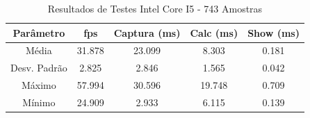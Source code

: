 \documentclass[conference]{IEEEtran}
\begin{document}
%


\begin{table}[h]\centering
\renewcommand{\arraystretch}{1.3}
\caption{Resultados de Testes Intel Core I5 - 743 Amostras}
\label{tab:table_pc}
\begin{tabular}{|c|c|c|c|c|}

\hline
\textbf{Parâmetro} & \textbf{fps} & \textbf{Captura (ms)} & \textbf{Calc (ms)} & \textbf{Show (ms)} \\\hline \hline
Média			& 31.878	& 23.099	&	8.303	&	0.181	\\ \hline
Desv. Padrão	& 2.825		& 2.846		&	1.565	&	0.042	\\ \hline
Máximo			& 57.994	& 30.596 	&	19.748	&	0.709	\\ \hline
Mínimo			& 24.909	& 2.933 	&	6.115	&	0.139	\\ \hline

\end{tabular}
\end{table}
\end{document}
